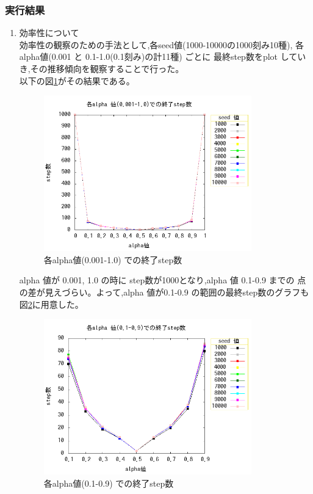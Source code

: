 \subsubsection{実行結果}
  \begin{enumerate}
  \renewcommand{\labelenumi}{\arabic{enumi}}

  \item 効率性について\\
	効率性の観察のための手法として,各seed値(1000-10000の1000刻み10種),
	各alpha値(0.001 と 0.1-1.0(0.1刻み)の計11種) ごとに
	最終step数をplot していき,その推移傾向を観察することで行った。\\
	以下の図\ref{stepgraph1}がその結果である。

  \begin{figure}[H]
	\begin{center} %
	  \includegraphics[width=9cm]{../steepestsearch2-2/createStepGraph/StepGraph.png}
	  \caption{各alpha値(0.001-1.0) での終了step数} %
	  \label{stepgraph1} %
	\end{center}
  \end{figure}

  alpha 値が 0.001, 1.0 の時に step数が1000となり,alpha 値 0.1-0.9 までの
  点の差が見えづらい。よって,alpha 値が0.1-0.9 の範囲の最終step数のグラフも
  図\ref{stepgraph2}に用意した。
  \begin{figure}[H]
	\begin{center} %
	  \includegraphics[width=9cm]{../steepestsearch2-2/createStepGraph/StepGraph2.png}
	  \caption{各alpha値(0.1-0.9) での終了step数} %
	  \label{stepgraph2} %
	\end{center}
  \end{figure}



\end{enumerate}
